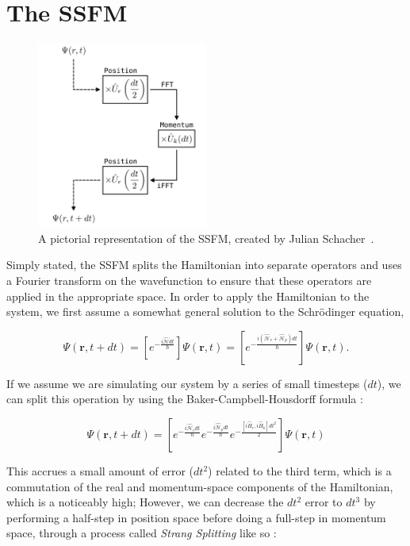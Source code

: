 \section{The SSFM}
\begin{figure}
\center \includegraphics[width=0.5\textwidth]{data/splitop/method/split_op_method.pdf}

\caption{A pictorial representation of the SSFM, created by Julian Schacher~\cite{AAA}.}
\label{fig:method}
\end{figure}

Simply stated, the SSFM splits the Hamiltonian into separate operators and uses a Fourier transform on the wavefunction to ensure that these operators are applied in the appropriate space.
In order to apply the Hamiltonian to the system, we first assume a somewhat general solution to the Schr\"odinger equation,

$$
\Psi(\mathbf{r},t + dt) = \left[e^{-\frac{i\mathcal{\hat{H}}dt}{\hbar}}\right]\Psi(\mathbf{r},t) = \left[e^{-\frac{i(\mathcal{\hat{H}}_v + \mathcal{\hat{H}}_p)dt}{\hbar}}\right]\Psi(\mathbf{r},t).
$$

\noindent If we assume we are simulating our system by a series of small timesteps ($dt$), we can split this operation by using the Baker-Campbell-Housdorff formula :

$$
\Psi(\mathbf{r},t+dt) = \left[e^{-\frac{i\mathcal{\hat{H}}_vdt}{\hbar}}e^{-\frac{i\mathcal{\hat{H}}_pdt}{\hbar}}e^{-\frac{[i\hat{H}_r, i\hat{H}_k]dt^2}{2}}\right]\Psi(\mathbf{r},t)
$$

\noindent This accrues a small amount of error ($dt^2$) related to the third term, which is a commutation of the real and momentum-space components of the Hamiltonian, which is a noticeably high;
However, we can decrease the $dt^2$ error to $dt^3$ by performing a half-step in position space before doing a full-step in momentum space, through a process called \textit{Strang Splitting} like so :

